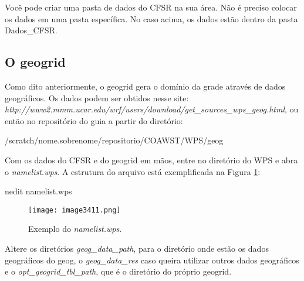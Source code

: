 \begin{tcolorbox}[enhanced,
  grow to left by=0cm,%
  grow to right by=0cm,%
  enlarge top by=0cm,%
  enlarge bottom by=0cm,%
  tcbox raise base,
  boxrule=1.0pt,
  left=18mm,
  colframe=red!50!black,coltext=red!25!black,colback=red!10!white,
  overlay={\begin{tcbclipinterior}\fill[red!75!blue!50!white] (frame.south west)
    rectangle node[text=white,font=\sffamily\bfseries\footnotesize,rotate=0] {ATENÇÃO} ([xshift=18mm]frame.north west);\end{tcbclipinterior}}]
Você pode criar uma pasta de dados do CFSR na sua área. Não é preciso colocar os dados em uma pasta específica. No caso acima, os dados estão dentro da pasta Dados\_CFSR.
\end{tcolorbox}
\bigskip

\subsection{O geogrid}\label{geowps}
\bigskip

\noindent Como dito anteriormente, o geogrid gera o domínio da grade através de dados geográficos. Os dados podem ser obtidos nesse site: \textcolor{bleu_cite}{\textit{http://www2.mmm.ucar.edu/wrf/users/download/get\_sources\_wps\_geog.html}}, ou então no repositório do guia a partir do diretório:
\bigskip

\begin{bashcode}
/scratch/nome.sobrenome/repositorio/COAWST/WPS/geog
\end{bashcode}
\bigskip

\noindent Com os dados do CFSR e do geogrid em mãos, entre no diretório do WPS e abra o \textit{namelist.wps}. A estrutura do arquivo está exemplificada na Figura \textcolor{bleu_cite}{\ref{namelistwps}}:
\bigskip

\begin{bashcode}
nedit namelist.wps
\end{bashcode}
\bigskip

\begin{figure}[H]
    \centering
    \texttt{[image: image3411.png]}
    \caption{Exemplo do \textit{namelist.wps}.}
    \label{namelistwps}
\end{figure}
\bigskip

\noindent Altere os diretórios \textit{geog\_data\_path}, para o diretório onde estão os dados geográficos do geog, o \textit{geog\_data\_res} caso queira utilizar outros dados geográficos e o \textit{opt\_geogrid\_tbl\_path}, que é o diretório do próprio geogrid.
\bigskip

